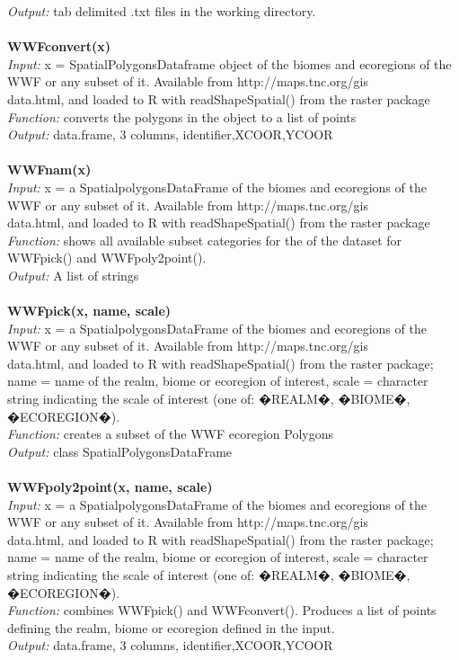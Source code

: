 \documentclass[a4paper,titlepage,11pt]{scrreprt}
\begin{document}
\textit{Output:} tab delimited .txt files in the working directory.\\
\\
\textbf{WWFconvert(x)}\\
\textit{Input:} x = SpatialPolygonsDataframe object of the biomes and ecoregions of the WWF or any subset of it. Available from http://maps.tnc.org/gis\\data.html, and loaded to R with readShapeSpatial() from the raster package\\
\textit{Function:} converts the polygons in the object to a list of points\\
\textit{Output:} data.frame, 3 columns, identifier,XCOOR,YCOOR\\
\\
\textbf{WWFnam(x)}\\
\textit{Input:} x = a SpatialpolygonsDataFrame of the biomes and ecoregions of the WWF or any subset of it. Available from http://maps.tnc.org/gis\\data.html, and loaded to R with readShapeSpatial() from the raster package\\
\textit{Function:} shows all available subset categories for the of the dataset for WWFpick() and WWFpoly2point().\\
\textit{Output:} A list of strings\\
\\
\textbf{WWFpick(x, name, scale)}\\
\textit{Input:} x = a SpatialpolygonsDataFrame of the biomes and ecoregions of the WWF or any subset of it. Available from http://maps.tnc.org/gis\\data.html, and loaded to R with readShapeSpatial() from the raster package; name = name of the realm, biome or ecoregion of interest, scale = character string indicating the scale of interest (one of: �REALM�, �BIOME�, �ECOREGION�).\\
\textit{Function:} creates a subset of the WWF ecoregion Polygons\\
\textit{Output:} class SpatialPolygonsDataFrame\\
\\
\textbf{WWFpoly2point(x, name, scale)}\\
\textit{Input:} x = a SpatialpolygonsDataFrame of the biomes and ecoregions of the WWF or any subset of it. Available from http://maps.tnc.org/gis\\data.html, and loaded to R with readShapeSpatial() from the raster package; name = name of the realm, biome or ecoregion of interest, scale = character string indicating the scale of interest (one of: �REALM�, �BIOME�, �ECOREGION�).\\
\textit{Function:} combines WWFpick() and WWFconvert(). Produces a list of points defining the realm, biome or ecoregion defined in the input.\\
\textit{Output:} data.frame, 3 columns, identifier,XCOOR,YCOOR\\
\end{document}
